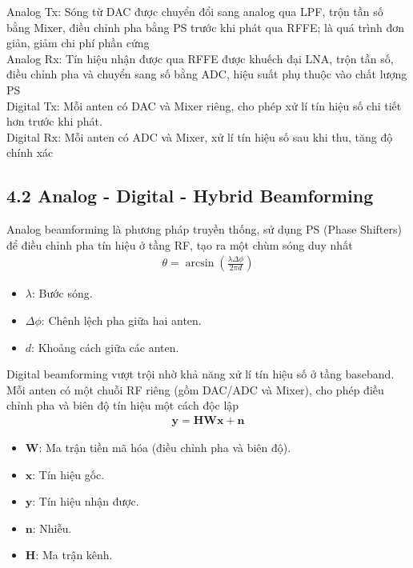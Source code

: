\documentclass[a4paper,13pt]{article} %
\begin{document}
Analog Tx: Sóng từ DAC được chuyển đổi sang analog qua LPF, trộn tần số bằng Mixer, điều chỉnh pha bằng PS trước khi phát qua RFFE; là quá trình đơn giản, giảm chi phí phần cứng \\

Analog Rx: Tín hiệu nhận được qua RFFE được khuếch đại LNA, trộn tần số, điều chỉnh pha và chuyển sang số bằng ADC, hiệu suất phụ thuộc vào chất lượng PS \\

Digital Tx: Mỗi anten có DAC và Mixer riêng, cho phép xử lí tín hiệu số chi tiết hơn trước khi phát. \\

Digital Rx: Mỗi anten có ADC và Mixer, xử lí tín hiệu số sau khi thu, tăng độ chính xác

\subsection{4.2 Analog - Digital - Hybrid Beamforming}
Analog beamforming là phương pháp truyền thống, sử dụng PS (Phase Shifters) để điều chỉnh pha tín hiệu ở tầng RF, tạo ra một chùm sóng duy nhất 
\begin{align}
\theta = \arcsin\left(\frac{\lambda \Delta \phi}{2\pi d}\right) \tag{5}
\end{align}

\begin{itemize}
    \item \(\lambda\): Bước sóng.
    \item \(\Delta \phi\): Chênh lệch pha giữa hai anten.
    \item \(d\): Khoảng cách giữa các anten.
\end{itemize}

Digital beamforming vượt trội nhờ khả năng xử lí tín hiệu số ở tầng baseband. Mỗi anten có một chuỗi RF riêng (gồm DAC/ADC và Mixer), cho phép điều chỉnh pha và biên độ tín hiệu một cách độc lập 
\begin{align}
\mathbf{y} = \mathbf{H} \mathbf{W} \mathbf{x} + \mathbf{n} \tag{6}
\end{align}
\begin{itemize}
    \item \(\mathbf{W}\): Ma trận tiền mã hóa (điều chỉnh pha và biên độ).
    \item \(\mathbf{x}\): Tín hiệu gốc.
    \item \(\mathbf{y}\): Tín hiệu nhận được.
    \item \(\mathbf{n}\): Nhiễu.
    \item \(\mathbf{H}\): Ma trận kênh.
\end{itemize}
\end{document}
